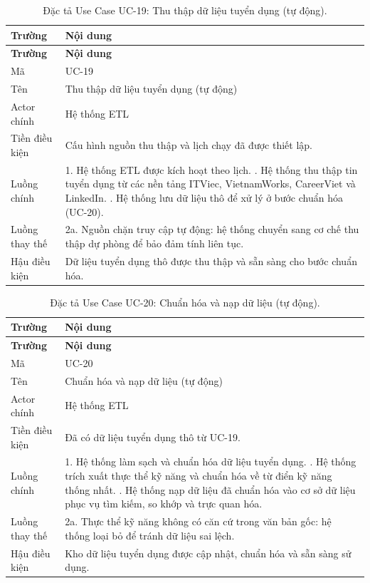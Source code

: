 \begin{longtable}{|L{3.5cm}|L{10cm}|}
\caption{Đặc tả Use Case UC-19: Thu thập dữ liệu tuyển dụng (tự động).}
\label{tab:uc19} \\
\hline
\textbf{Trường} & \textbf{Nội dung} \\
\hline
\endfirsthead
\hline
\textbf{Trường} & \textbf{Nội dung} \\
\hline
\endhead
Mã & UC-19 \\
\hline
Tên & Thu thập dữ liệu tuyển dụng (tự động) \\
\hline
Actor chính & Hệ thống ETL \\
\hline
Tiền điều kiện & Cấu hình nguồn thu thập và lịch chạy đã được thiết lập. \\
\hline
Luồng chính & 1. Hệ thống ETL được kích hoạt theo lịch. . Hệ thống thu thập tin tuyển dụng từ các nền tảng ITViec, VietnamWorks, CareerViet và LinkedIn. . Hệ thống lưu dữ liệu thô để xử lý ở bước chuẩn hóa (UC-20). \\
\hline
Luồng thay thế & 2a. Nguồn chặn truy cập tự động: hệ thống chuyển sang cơ chế thu thập dự phòng để bảo đảm tính liên tục. \\
\hline
Hậu điều kiện & Dữ liệu tuyển dụng thô được thu thập và sẵn sàng cho bước chuẩn hóa. \\
\hline
\end{longtable}

\begin{longtable}{|L{3.5cm}|L{10cm}|}
\caption{Đặc tả Use Case UC-20: Chuẩn hóa và nạp dữ liệu (tự động).}
\label{tab:uc20} \\
\hline
\textbf{Trường} & \textbf{Nội dung} \\
\hline
\endfirsthead
\hline
\textbf{Trường} & \textbf{Nội dung} \\
\hline
\endhead
Mã & UC-20 \\
\hline
Tên & Chuẩn hóa và nạp dữ liệu (tự động) \\
\hline
Actor chính & Hệ thống ETL \\
\hline
Tiền điều kiện & Đã có dữ liệu tuyển dụng thô từ UC-19. \\
\hline
Luồng chính & 1. Hệ thống làm sạch và chuẩn hóa dữ liệu tuyển dụng. . Hệ thống trích xuất thực thể kỹ năng và chuẩn hóa về từ điển kỹ năng thống nhất. . Hệ thống nạp dữ liệu đã chuẩn hóa vào cơ sở dữ liệu phục vụ tìm kiếm, so khớp và trực quan hóa. \\
\hline
Luồng thay thế & 2a. Thực thể kỹ năng không có căn cứ trong văn bản gốc: hệ thống loại bỏ để tránh dữ liệu sai lệch. \\
\hline
Hậu điều kiện & Kho dữ liệu tuyển dụng được cập nhật, chuẩn hóa và sẵn sàng sử dụng. \\
\hline
\end{longtable}
